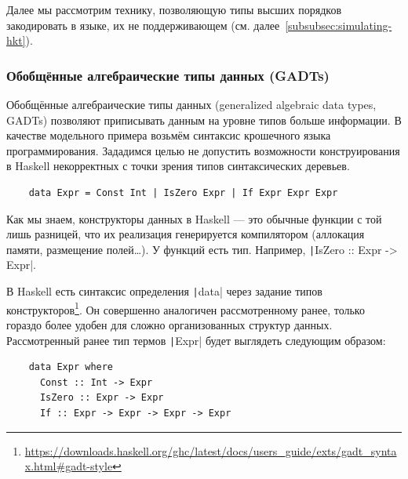 Далее мы рассмотрим технику, позволяющую типы высших порядков закодировать в языке, их не поддерживающем (см. далее~\ref{subsubsec:simulating-hkt}).


\subsubsection{Обобщённые алгебраические типы данных (GADTs)} \label{subsubsec:gadts}

Обобщённые алгебраические типы данных (generalized algebraic data types, GADTs) позволяют приписывать данным на уровне типов больше информации.
В качестве модельного примера возьмём синтаксис крошечного языка программирования.
Зададимся целью не допустить возможности конструирования в Haskell некорректных с точки зрения типов синтаксических деревьев.
\begin{verbatim}
    data Expr = Const Int | IsZero Expr | If Expr Expr Expr
\end{verbatim}

Как мы знаем, конструкторы данных в Haskell --- это обычные функции с той лишь разницей, что их реализация генерируется компилятором (аллокация памяти, размещение полей\ldots).
У функций есть тип.
Например, \texttt|IsZero :: Expr -> Expr|.

В Haskell есть синтаксис определения \texttt|data| через задание типов конструкторов\footnote{\url{https://downloads.haskell.org/ghc/latest/docs/users_guide/exts/gadt_syntax.html\#gadt-style}}.
Он совершенно аналогичен рассмотренному ранее, только гораздо более удобен для сложно организованных структур данных.
Рассмотренный ранее тип термов \texttt|Expr| будет выглядеть следующим образом:
\begin{verbatim}
    data Expr where
      Const :: Int -> Expr
      IsZero :: Expr -> Expr
      If :: Expr -> Expr -> Expr -> Expr
\end{verbatim}

